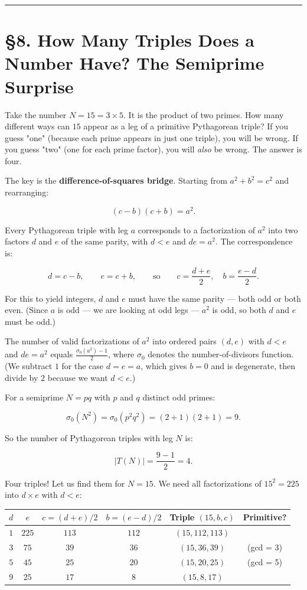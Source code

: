 \documentclass[11pt,openany]{book}
\theoremstyle{definition}
\theoremstyle{plain}
\theoremstyle{remark}
\begin{document}
\bigskip\noindent\rule{\textwidth}{0.4pt}\bigskip


\section{§8. How Many Triples Does a Number Have? The Semiprime Surprise}


Take the number $N = 15 = 3 \times 5$. It is the product of two primes. How many different ways can $15$ appear as a leg of a primitive Pythagorean triple? If you guess "one" (because each prime appears in just one triple), you will be wrong. If you guess "two" (one for each prime factor), you will \textit{also} be wrong. The answer is four.

The key is the \textbf{difference-of-squares bridge}. Starting from $a^2 + b^2 = c^2$ and rearranging:

$$(c - b)(c + b) = a^2.$$

Every Pythagorean triple with leg $a$ corresponds to a factorization of $a^2$ into two factors $d$ and $e$ of the same parity, with $d < e$ and $de = a^2$. The correspondence is:

$$d = c - b, \qquad e = c + b, \qquad \text{so} \qquad c = \frac{d + e}{2}, \quad b = \frac{e - d}{2}.$$

For this to yield integers, $d$ and $e$ must have the same parity — both odd or both even. (Since $a$ is odd — we are looking at odd legs — $a^2$ is odd, so both $d$ and $e$ must be odd.)

The number of valid factorizations of $a^2$ into ordered pairs $(d, e)$ with $d < e$ and $de = a^2$ equals $\frac{\sigma_0(a^2) - 1}{2}$, where $\sigma_0$ denotes the number-of-divisors function. (We subtract $1$ for the case $d = e = a$, which gives $b = 0$ and is degenerate, then divide by $2$ because we want $d < e$.)

For a semiprime $N = pq$ with $p$ and $q$ distinct odd primes:

$$\sigma_0(N^2) = \sigma_0(p^2 q^2) = (2 + 1)(2 + 1) = 9.$$

So the number of Pythagorean triples with leg $N$ is:

$$|T(N)| = \frac{9 - 1}{2} = 4.$$

Four triples! Let us find them for $N = 15$. We need all factorizations of $15^2 = 225$ into $d \times e$ with $d < e$:

\begin{center}
\begin{tabular}{c|c|c|c|c|c}
\toprule
$d$ & $e$ & $c = (d+e)/2$ & $b = (e-d)/2$ & Triple $(15, b, c)$ & Primitive? \\
\midrule
$1$ & $225$ & $113$ & $112$ & $(15, 112, 113)$ &  \\
$3$ & $75$ & $39$ & $36$ & $(15, 36, 39)$ &  (gcd = 3) \\
$5$ & $45$ & $25$ & $20$ & $(15, 20, 25)$ &  (gcd = 5) \\
$9$ & $25$ & $17$ & $8$ & $(15, 8, 17)$ &  \\
\bottomrule
\end{tabular}
\end{center}
\end{document}
